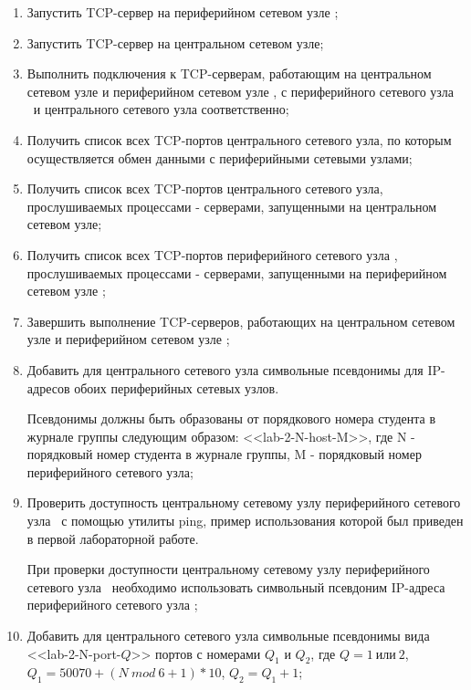 	\begin{enumerate}

		\item Запустить TCP-сервер на периферийном сетевом узле \first;
		\item Запустить TCP-сервер на центральном сетевом узле;
		\item Выполнить подключения к TCP-серверам, работающим на центральном сетевом узле
		и периферийном сетевом узле \first, с периферийного сетевого узла\\\second\ и центрального сетевого узла
		соответственно;
		\item Получить список всех TCP-портов центрального сетевого узла, по которым осуществляется обмен данными с
		периферийными сетевыми узлами;
		\item Получить список всех TCP-портов центрального сетевого узла, прослушиваемых процессами - серверами,
		запущенными на центральном сетевом узле;
		\item Получить список всех TCP-портов периферийного сетевого узла \second, прослушиваемых процессами -
		серверами, запущенными на периферийном сетевом узле \second;
		\item Завершить выполнение TCP-серверов, работающих на центральном сетевом узле и периферийном сетевом
		узле \first;
		\item Добавить для центрального сетевого узла символьные псевдонимы для IP-адресов обоих периферийных сетевых
		узлов.

		Псевдонимы должны быть образованы от порядкового номера студента в журнале группы следующим образом:
		<<lab-2-N-host-M>>, где N - порядковый номер студента в журнале группы, M - порядковый номер периферийного
		сетевого узла;

		\item Проверить доступность центральному сетевому узлу периферийного сетевого узла \linebreak \first\ с помощью утилиты
		ping, пример использования которой был приведен в первой лабораторной работе.

		При проверки доступности центральному сетевому узлу периферийного сетевого узла \first\ необходимо
		использовать символьный псевдоним IP-адреса периферийного сетевого узла \first;

		\item Добавить для центрального сетевого узла символьные псевдонимы вида\\<<lab-2-N-port-$Q$>> портов с
		номерами $Q_1$ и $Q_2$, где $Q = 1~\text{или}~2$, $Q_1 = 50070 + (N~mod~6 + 1) * 10$, $Q_2 = Q_1 + 1$;


\end{enumerate}
